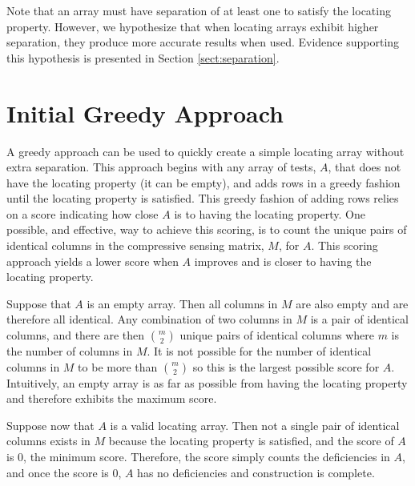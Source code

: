 Note that an array must have separation of at least one to satisfy the locating property.
However, we hypothesize that when locating arrays exhibit higher separation, they produce more accurate results when used.
Evidence supporting this hypothesis is presented in Section \ref{sect:separation}.

\section{Initial Greedy Approach} \label{sect:greedy}

A greedy approach can be used to quickly create a simple locating array without extra separation.
This approach begins with any array of tests, $A$, that does not have the locating property (it can be empty), and adds rows in a greedy fashion until the locating property is satisfied.
This greedy fashion of adding rows relies on a score indicating how close $A$ is to having the locating property.
One possible, and effective, way to achieve this scoring, is to count the unique pairs of identical columns in the compressive sensing matrix, $M$, for $A$.
This scoring approach yields a lower score when $A$ improves and is closer to having the locating property.

Suppose that $A$ is an empty array.
Then all columns in $M$ are also empty and are therefore all identical.
Any combination of two columns in $M$ is a pair of identical columns, and there are then $m \choose 2$ unique pairs of identical columns where $m$ is the number of columns in $M$.
It is not possible for the number of identical columns in $M$ to be more than $m \choose 2$ so this is the largest possible score for $A$.
Intuitively, an empty array is as far as possible from having the locating property and therefore exhibits the maximum score.

Suppose now that $A$ is a valid locating array.
Then not a single pair of identical columns exists in $M$ because the locating property is satisfied, and the score of $A$ is $0$, the minimum score.
Therefore, the score simply counts the deficiencies in $A$, and once the score is $0$, $A$ has no deficiencies and construction is complete.

